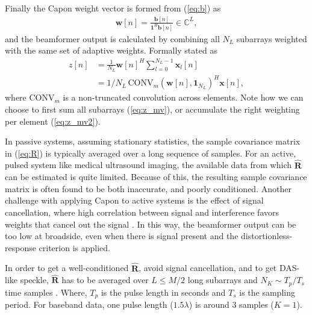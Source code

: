 \documentclass[12pt,journal,onecolumn]{IEEEtran}
\newcommand{\mat}[1]{\mathbf{#1}}
\renewcommand{\vec}[1]{\mathbf{#1}}
\begin{document}
Finally the Capon weight vector is formed from (\ref{eq:b}) as
\begin{align}\label{eq:w}
\vec{w}[n] = \frac{\vec{b}[n]}{\vec{1}^H\vec{b}[n]} \in \mathbb{C}^L,
\end{align}
and the beamformer output is calculated by combining all $N_L$ subarrays weighted with the same set of adaptive weights. Formally stated as
\begin{align}
z[n] &= \frac{1}{N_L}\vec{w}[n]^H \sum_{l=0}^{N_L-1} \vec{x}_l[n] \label{eq:z_mv}\\
&= 1/N_L \, \text{CONV}_m(\vec{w}[n], \vec{1}_{N_L})^H\vec{x}[n] \label{eq:z_mv2},
\end{align}
where $\text{CONV}_m$ is a non-truncated convolution across elements.
Note how we can choose to first sum all subarrays (\ref{eq:z_mv}), or accumulate the right weighting per element (\ref{eq:z_mv2}).

In passive systems, assuming stationary statistics, the sample covariance matrix in (\ref{eq:R}) is typically averaged over a long sequence of samples\cite{Krima}. For an active, pulsed system like medical ultrasound imaging, the available data from which $\mat{\hat{R}}$ can be estimated is quite limited. Because of this, the resulting sample covariance matrix is often found to be both inaccurate, and poorly conditioned. Another challenge with applying Capon to active systems is the effect of signal cancellation, where high correlation between signal and interference favors weights that cancel out the signal \cite{Reddy1987}. In this way, the beamformer output can be too low at broadside, even when there is signal present and the distortionless-response criterion is applied. 

In order to get a well-conditioned $\mat{\hat{R}}$, avoid signal cancellation, and to get DAS-like speckle, $\mat{\hat{R}}$ has to be averaged over $L\le M/2$ long subarrays and $N_K \sim T_p/T_s$ time samples \cite{Synnevag2007, Synnevag2007a}. Where, $T_p$ is the pulse length in seconds and $T_s$ is the sampling period. For baseband data, one pulse length ($1.5\lambda$) is around 3 samples ($K=1$).
\end{document}
